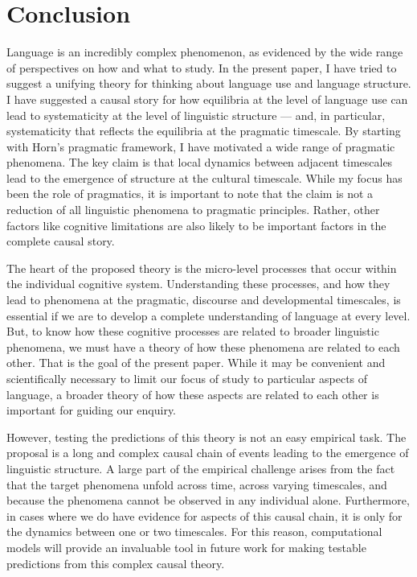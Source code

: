 \documentclass[man, noapacite, 12pt]{apa2}
\begin{document}



\section{Conclusion} 
Language is an incredibly complex phenomenon, as evidenced by the wide range of perspectives on how and what to study. In the present paper, I have tried to suggest a unifying theory for thinking about language use and language structure. I have suggested a causal story for how  equilibria at the level of language use can lead to systematicity at the level of linguistic structure --- and, in particular, systematicity that reflects the equilibria at the pragmatic timescale. By starting with Horn's pragmatic framework, I have motivated a wide range of pragmatic phenomena. The key claim is that local dynamics between adjacent timescales lead to the emergence of structure at the cultural timescale. While my focus has been the role of pragmatics, it is important to note that  the claim is not a reduction of all linguistic phenomena to pragmatic principles. Rather, other factors like cognitive limitations are also likely to be important factors in the complete causal story.

The heart of the proposed theory is the micro-level processes that occur within the individual cognitive system. Understanding these processes, and how they lead to phenomena at the pragmatic, discourse and developmental timescales, is essential if we are to develop a complete understanding of language at every level. But, to know how these cognitive processes are related to broader linguistic phenomena, we must have a theory of how these phenomena are related to each other. That is the goal of the present paper. While it may be convenient and scientifically necessary to limit our focus of study to particular aspects of language, a broader theory of how these aspects are related  to each other is important for guiding our  enquiry. 

However, testing the predictions of this theory is not an easy empirical task. The proposal is a long and complex causal chain of events leading to the emergence of linguistic structure. A large part of the empirical challenge arises from the fact that the target phenomena unfold  across time, across varying timescales, and because the phenomena cannot be observed in any individual alone. Furthermore, in cases where we do have evidence for aspects of this causal chain, it is only for the dynamics between one or two timescales. For this reason, computational models will provide an invaluable tool in future work for making testable predictions from this complex causal theory. 
\end{document}
